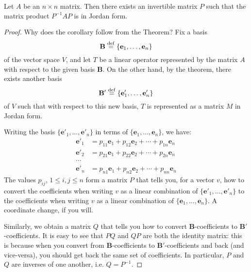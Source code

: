 \begin{cor}
Let $A$ be an $n \times n$ matrix. Then there exists an invertible 
matrix $P$ such that the matrix product $P^{-1}AP$ is in Jordan
form.
\end{cor}
\begin{proof}
Why does the corollary follow from the Theorem? Fix a basis
\[
\mathbf{B} \stackrel{\mathrm{def}}{=} \{\mathbf{e}_1,\dots, \mathbf{e}_n\}
\]
of the vector space $V$, and let $T$ be a linear operator 
represented by the matrix $A$ with respect to the given basis 
$\mathbf{B}$. On the other hand, by the theorem, there exists 
another basis 
\[
\mathbf{B}' \stackrel{\mathrm{def}}{=} \{\mathbf{e}'_1,\dots, \mathbf{e}'_n\}
\] 
of $V$ such that with respect to this new basis, $T$ is 
represented as a matrix $M$ in Jordan form.

Writing the basis $\{\mathbf{e}'_1,\dots,\mathbf{e}'_n\}$ in terms
of $\{\mathbf{e}_1,\dots,\mathbf{e}_n\}$, we have:
\begin{align*}
\mathbf{e}'_1 &= p_{11}\mathbf{e}_1 + p_{12}\mathbf{e}_2 + \cdots +
p_{1n}\mathbf{e}_n \\
\mathbf{e}'_2 &= p_{21}\mathbf{e}_1 + p_{22}\mathbf{e}_2 + \cdots +
p_{2n}\mathbf{e}_n \\
\cdots\\
\mathbf{e}'_n &= p_{n1}\mathbf{e}_1 + p_{n2}\mathbf{e}_2 + \cdots +
p_{nn}\mathbf{e}_n 
\end{align*}
The values $p_{ij}$, $1 \leq i,j \leq n$ form a matrix $P$ that 
tells you, for a vector $v$, how to convert the coefficients when 
writing $v$ as a linear combination of $\{\mathbf{e}'_1, \dots, 
\mathbf{e}'_n\}$ to the coefficients when writing $v$ as a linear 
combination of $\{\mathbf{e}_1,\dots, \mathbf{e}_n\}$. A 
coordinate change, if you will.

Similarly, we obtain a matrix $Q$ that tells you how to convert
$\mathbf{B}$-coefficients to $\mathbf{B}'$-coefficients. It is easy
to see that $PQ$ and $QP$ are both the identity matrix: this is 
because when you convert from $\mathbf{B}$-coefficients to 
$\mathbf{B}'$-coefficients and back (and vice-versa), you should
get back the same set of coefficients. In particular, $P$ and $Q$
are inverses of one another, i.e. $Q = P^{-1}$.


\end{proof}
